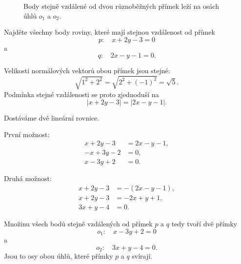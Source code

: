 \begin{figure}[H]
    \centering
    \caption{Body stejně vzdálené od dvou různoběžných přímek leží
    na osách úhlů $o_1$ a $o_2$.}
    \label{fig:Angle_bisectors_equidistant_lines}
\end{figure}

\begin{example}\label{exa:Angle_bisectors_from_distance}
    Najděte všechny body roviny, které mají stejnou vzdálenost od
    přímek
    \[
        p:\quad x+2y-3=0
    \]
    a
    \[
        q:\quad 2x-y-1=0.
    \]

    Velikosti normálových vektorů obou přímek jsou stejné:
    \[
        \sqrt{1^2+2^2}
        =
        \sqrt{2^2+(-1)^2}
        =
        \sqrt5.
    \]
    Podmínka stejné vzdálenosti se proto zjednoduší na
    \[
        |x+2y-3|
        =
        |2x-y-1|.
    \]

    Dostáváme dvě lineární rovnice.

    První možnost:
    \begin{align*}
        x+2y-3&=2x-y-1,\\
        -x+3y-2&=0,\\
        x-3y+2&=0.
    \end{align*}

    Druhá možnost:
    \begin{align*}
        x+2y-3&=-(2x-y-1),\\
        x+2y-3&=-2x+y+1,\\
        3x+y-4&=0.
    \end{align*}

    Množinu všech bodů stejně vzdálených od přímek $p$ a $q$ tedy
    tvoří dvě přímky
    \[
        o_1:\quad x-3y+2=0
    \]
    a
    \[
        o_2:\quad 3x+y-4=0.
    \]
    Jsou to osy obou úhlů, které přímky $p$ a $q$ svírají.
\end{example}

